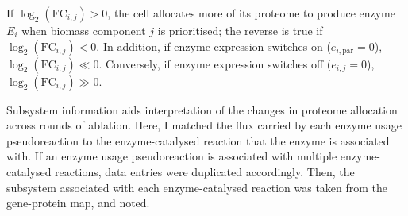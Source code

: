 If $\log_{2}(\mathrm{FC}_{i,j}) > 0$, the cell allocates more of its proteome to produce enzyme $E_{i}$ when biomass component $j$ is prioritised; the reverse is true if $\log_{2}(\mathrm{FC}_{i,j}) < 0$.
In addition, if enzyme expression switches on ($e_{i, \mathrm{par}} = 0$), $\log_{2}(\mathrm{FC}_{i,j}) \ll 0$.
Conversely, if enzyme expression switches off ($e_{i, j} = 0$), $\log_{2}(\mathrm{FC}_{i,j}) \gg 0$.

Subsystem information aids interpretation of the changes in proteome allocation across rounds of ablation.
Here, I matched the flux carried by each enzyme usage pseudoreaction to the enzyme-catalysed reaction that the enzyme is associated with.
If an enzyme usage pseudoreaction is associated with multiple enzyme-catalysed reactions, data entries were duplicated accordingly.
Then, the subsystem associated with each enzyme-catalysed reaction was taken from the gene-protein map, and noted.

